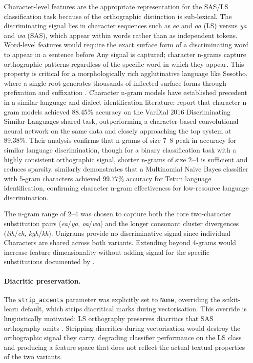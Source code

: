 \documentclass[12pt]{ThesisRU}
\begin{document}
Character-level features are the appropriate representation for
the SAS/LS classification task because of the orthographic distinction
is sub-lexical. The discriminating signal lies in character sequences
such as \textit{ea} and \textit{oa} (LS) versus \textit{ya} and
\textit{wa} (SAS), which appear within words rather than as
independent tokens. Word-level features would require the exact
surface form of a discriminating word to appear in a sentence before
Any signal is captured; character n-grams capture orthographic
patterns regardless of the specific word in which they appear.
This property is critical for a morphologically rich agglutinative
language like Sesotho, where a single root generates thousands of
inflected surface forms through prefixation and suffixation
\citep{kambarami2021computational}. Character n-gram models have
established precedent in a similar language and dialect
identification literature: \citet{cianflone2016n} report that
character n-gram models achieved 88.45\% accuracy on the VarDial
2016 Discriminating Similar Languages shared task, outperforming a
character-based convolutional neural network on the same data and
closely approaching the top system at 89.38\%. Their analysis
confirms that n-grams of size 7--8 peak in accuracy for similar
language discrimination, though for a binary classification task
with a highly consistent orthographic signal, shorter n-grams of
size 2--4 is sufficient and reduces sparsity.
\citet{de2024data} similarly demonstrates that a Multinomial
Naive Bayes classifier with 5-gram characters achieved 99.77\%
accuracy for Tetun language identification, confirming character
n-gram effectiveness for low-resource language discrimination.

The n-gram range of 2--4 was chosen to capture both the core
two-character substitution pairs (\textit{ea}/\textit{ya},
\textit{oa}/\textit{wa}) and the longer consonant cluster
divergences (\textit{tjh}/\textit{ch}, \textit{kgh}/\textit{kh}).
Unigrams provide no discriminative signal since individual
Characters are shared across both variants. Extending beyond
4-grams would increase feature dimensionality without adding
signal for the specific substitutions documented by
\citet{makutoane2022people}.

\paragraph{Diacritic preservation.}
The \texttt{strip\_accents} parameter was explicitly set to
\texttt{None}, overriding the scikit-learn default, which strips
diacritical marks during vectorisation. This override is
linguistically motivated: LS orthography preserves diacritics
that SAS orthography omits \citep{matlosa2017sesotho}. Stripping
diacritics during vectorisation would destroy the orthographic
signal they carry, degrading classifier performance on the LS
class and producing a feature space that does not reflect the
actual textual properties of the two variants.
\end{document}

